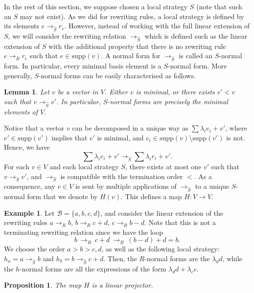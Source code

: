 \documentclass[10pt]{easychair}
\newtheorem{lemma}[theorem]{Lemma}
\newtheorem{proposition}[theorem]{Proposition}
\theoremstyle{definition}
\newtheorem{example}[theorem]{Example}
\newcommand\supp{\text{supp}}
\newcommand\basis{\mathscr{B}}
\newcommand\rewR{\to_R}
\newcommand\rewS{\to_{\hat{S}}}
\begin{document}
In the rest of this section, we suppose chosen a local strategy $S$ (note
that such an $S$ may not exist). As we did for rewriting rules, a local
strategy is defined by its elements $e\rewS r_e$. However, instead of
working with the full linear extension of $S$, we will consider the
rewriting relation $\rewS$ which is defined such as the linear extension
of $S$ with the additional property that there is no rewriting rule 
$e\rewR r_e$ such that $e\in\supp(v)$. A normal form for $\rewS$ is
called an $S$-normal form. In particular, every minimal basis element is
a $S$-normal form. More generally, $S$-normal forms can be easily
characterised as follows.

\begin{lemma}\label{lem:h_normal_forms}
  Let $v$ be a vector in $V$. Either $v$ is minimal, or there exists
  $v'<v$ such that $v\rewS v'$. In particular, $S$-normal forms are
  precisely the minimal elements of $V$.
\end{lemma}
\medskip

Notice that a vector $v$ can be
decomposed in a unique way as $\sum\lambda_ie_i+v'$, where
$e'\in\supp(v')$ implies that $e'$ is minimal, and
$e_i\in\supp(v)\setminus\supp(v')$ is not. Hence, we have
\begin{equation}\label{equ:well-formed_rewriting_step}
  \sum\lambda_ie_i+v'\rewS\sum\lambda_ir_i+v'.
\end{equation}
For each $v\in V$ and each local strategy $S$, there exists at most one
$v'$ such that $v\rewS v'$, and $\rewS$ is compatible with the
termination order $<$. As a consequence, any $v\in V$ is sent by multiple
applications of $\rewS$ to a unique $S$-normal form that we denote by
$H(v)$. This defines a map $H :V\to V$.  


\begin{example}\label{ex:h_norma_form}
  Let $\basis=\{a,b,c,d\}$, and consider the linear extension of the
  rewriting rules $a\rewR b$, $b\rewR c+d$, $c\rewR b-d$. Note that this
  is not a terminating rewriting relation since we have the loop
  \[b\ \rewR\ c+d\ \rewR\ (b-d)+d=b.\]
  We choose the order $a>b>c,d$, as well as the following local strategy:
  $h_a=a\rewS b$ and $h_b=b\rewS c+d$. Then, the $R$-normal forms are the
  $\lambda_dd$, while the $h$-normal forms are all the expressions of the
  form $\lambda_dd+\lambda_cc$.
\end{example}


\begin{proposition}\label{prop:linearity_of_H}
  The map $H$ is a linear projector.
\end{proposition}
\end{document}

